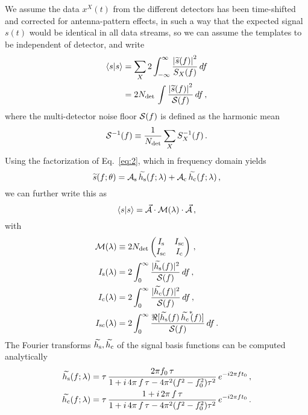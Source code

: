 \documentclass[aps,prd,onecolumn,notitlepage,nofootinbib,superscriptaddress,altaffilletter,floatfix]{revtex4-1}
\begin{document}
We assume the data $x^X(t)$ from the different detectors has been time-shifted and corrected for antenna-pattern effects, in such a way that the
expected signal $s(t)$ would be identical in all data streams, so we can assume the templates to be independent of detector, and write
\begin{align}
  \label{eq:15}
  \langle s|s\rangle &= \sum_X 2\int_{-\infty}^{\infty} \frac{\left| \widetilde{s}(f) \right|^2}{S_X(f)}\,df\\
  &= 2N_{\mathrm{det}}\,\int \frac{\left| \widetilde{s}(f) \right|^2}{\mathcal{S}(f)}\,df\,,
\end{align}
where the multi-detector noise floor $\mathcal{S}(f)$ is defined as the harmonic mean
\begin{equation}
  \label{eq:26}
  \mathcal{S}^{-1}(f) \equiv \frac{1}{N_{\mathrm{det}}}\sum_X S_X^{-1}(f)\,.
\end{equation}
Using the factorization of Eq.~\eqref{eq:2}, which in frequency domain yields
\begin{equation}
  \label{eq:34}
  \widetilde{s}(f;\theta) = \mathcal{A}_{\mathrm{s}}\,\widetilde{h_\mathrm{s}}(f;\lambda) + \mathcal{A}_{\mathrm{c}}\,\widetilde{h_\mathrm{c}}(f;\lambda)\,,
\end{equation}
we can further write this as
\begin{equation}
  \label{eq:36}
  \langle s|s\rangle = \vec{\mathcal{A}} \cdot \mathcal{M}(\lambda) \cdot \vec{\mathcal{A}}\,,
\end{equation}
with
\begin{align}
  \label{eq:35}
  \mathcal{M}(\lambda) &\equiv
  2N_{\mathrm{det}} \begin{pmatrix}
    I_{\mathrm{s}}  & I_{\mathrm{sc}} \\
    I_{\mathrm{sc}}  & I_{\mathrm{c}}\\
  \end{pmatrix}\,,\\
  I_{\mathrm{s}}(\lambda) &= 2 \int_{0}^{\infty} \frac{|\widetilde{h_\mathrm{s}}(f)|^2}{\mathcal{S}(f)}\,df \,,\\
  I_{\mathrm{c}}(\lambda) &= 2 \int_{0}^{\infty} \frac{|\widetilde{h_\mathrm{c}}(f)|^2}{\mathcal{S}(f)}\,df \,,\\
  I_{\mathrm{sc}}(\lambda)&= 2 \int_{0}^{\infty} \frac{\Re[\widetilde{h_\mathrm{s}}(f)\,\widetilde{h_\mathrm{c}}^{*}\!\!(f)]}{\mathcal{S}(f)}\,df \,.
\end{align}
The Fourier transforms $\widetilde{h_\mathrm{s}},\widetilde{h_\mathrm{c}}$ of the signal basis functions can be computed analytically
\begin{align}
  \label{eq:37}
  \widetilde{h_\mathrm{s}}(f;\lambda) &= \tau\,\frac{2\pi f_0\,\tau}{1 + i\,4\pi\,f\,\tau -  4\pi^2(f^2 - f_0^2)\tau^2} \, e^{-i2\pi ft_0} \,,\\
  \widetilde{h_\mathrm{c}}(f;\lambda) &= \tau\,\frac{1 + i\,2\pi\,f\,\tau}{1 + i\,4\pi\,f\,\tau - 4\pi^2(f^2 - f_0^2)\tau^2} \, e^{-i2\pi ft_0} \,.
\end{align}
\end{document}
